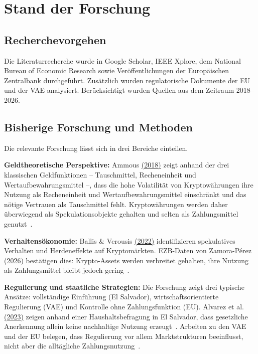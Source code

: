 \chapter{Stand der Forschung}
\label{chap:forschungsstand}

\section{Recherchevorgehen}

Die Literaturrecherche wurde in Google Scholar, IEEE Xplore, dem National Bureau of Economic Research sowie Veröffentlichungen der Europäischen Zentralbank durchgeführt. Zusätzlich wurden regulatorische Dokumente der EU und der VAE analysiert. Berücksichtigt wurden Quellen aus dem Zeitraum 2018–2026.

\section{Bisherige Forschung und Methoden}
\label{sec:bisherige-forschung-methoden}

Die relevante Forschung lässt sich in drei Bereiche einteilen.

\textbf{Geldtheoretische Perspektive:} Ammous \hyperref[Ammous2018]{(2018)} zeigt anhand der drei klassischen Geldfunktionen -- Tauschmittel, Recheneinheit und Wertaufbewahrungsmittel --, dass die hohe Volatilität von Kryptowährungen ihre Nutzung als Recheneinheit und Wertaufbewahrungsmittel einschränkt und das nötige Vertrauen als Tauschmittel fehlt. Kryptowährungen werden daher überwiegend als Spekulationsobjekte gehalten und selten als Zahlungsmittel genutzt~\cite{Ammous2018}.

\textbf{Verhaltensökonomie:} Ballis \& Verousis \hyperref[Ballis2022]{(2022)} identifizieren spekulatives Verhalten und Herdeneffekte auf Kryptomärkten. EZB-Daten von Zamora-Pérez \hyperref[Zamora2026]{(2026)} bestätigen dies: Krypto-Assets werden verbreitet gehalten, ihre Nutzung als Zahlungsmittel bleibt jedoch gering~\cite{Ballis2022, Zamora2026}.

\textbf{Regulierung und staatliche Strategien:} Die Forschung zeigt drei typische Ansätze: vollständige Einführung (El Salvador), wirtschaftsorientierte Regulierung (VAE) und Kontrolle ohne Zahlungsfunktion (EU). Alvarez et al. \hyperref[Alvarez2023]{(2023)} zeigen anhand einer Haushaltsbefragung in El Salvador, dass gesetzliche Anerkennung allein keine nachhaltige Nutzung erzeugt~\cite{Alvarez2023}. Arbeiten zu den VAE und der EU belegen, dass Regulierung vor allem Marktstrukturen beeinflusst, nicht aber die alltägliche Zahlungsnutzung~\cite{VARA2025, MiCA2023}.

